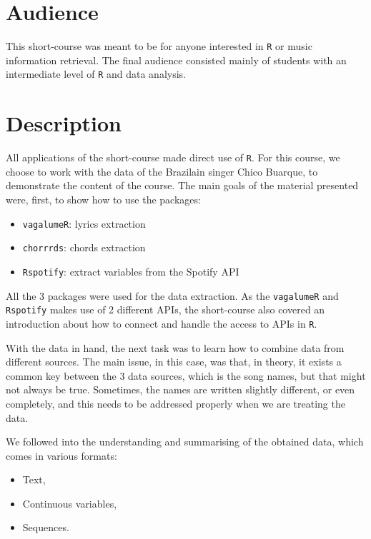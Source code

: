\section{Audience}

This short-course was meant to be for anyone interested in 
\texttt{R} or music information retrieval. The final audience 
consisted mainly of students with an intermediate level of
\texttt{R} and data analysis. 

\section{Description}

All applications of the short-course made direct use of 
\texttt{R}. For this course, we choose to work with the data of the Brazilain singer Chico Buarque, to demonstrate the 
content of the course. The main goals of the material 
presented were, first, to show how to use the packages:

\begin{itemize}
    \item \texttt{vagalumeR}: lyrics extraction
    \item \texttt{chorrrds}: chords extraction
    \item \texttt{Rspotify}: extract variables from the Spotify API
\end{itemize}

All the 3 packages were used for the data extraction. 
As the \texttt{vagalumeR} and \texttt{Rspotify} makes use of 
2 different APIs, the short-course also covered an introduction
about how to connect and handle the access to APIs in 
\texttt{R}. 

With the data in hand, the next task was to learn how to 
combine data from different sources. The main issue, in this
case, was that, in theory, it exists a common key between
the 3 data sources, which is the song names, 
but that might not always be true. Sometimes, the names
are written slightly different, or even completely, and this needs
to be addressed properly when we are treating the data.

We followed into the understanding and summarising of the 
obtained data, which comes in various formats:
\begin{itemize}
    \item Text,
    \item Continuous variables,
    \item Sequences.
\end{itemize}


